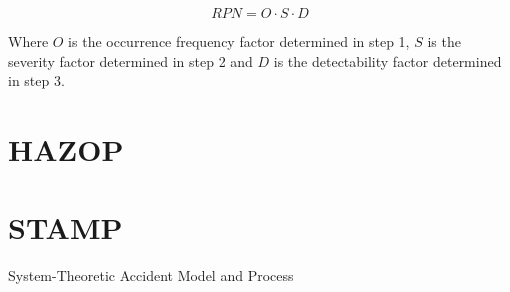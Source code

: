 \begin{equation}
RPN = O \cdot S \cdot D
\end{equation}

Where $O$ is the occurrence frequency factor determined in step 1, $S$ is the severity factor determined in step 2 and $D$ is the detectability factor determined in step 3.







\section{HAZOP}

\section{STAMP}
System-Theoretic Accident Model and Process

